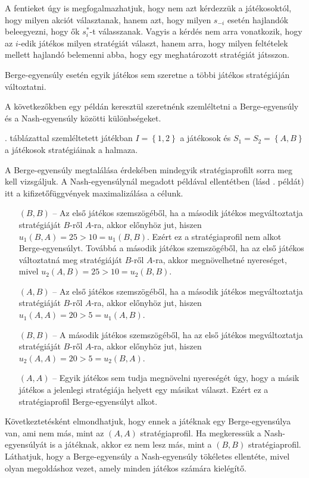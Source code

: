 A fentieket úgy is megfogalmazhatjuk, hogy nem azt kérdezzük a játékosoktól, hogy milyen akciót választanak, hanem azt, hogy milyen $s_{-i}$ esetén hajlandók beleegyezni, hogy ők $s^*_i$-t válasszanak.
Vagyis a kérdés nem arra vonatkozik, hogy az $i$-edik játékos milyen stratégiát választ, hanem arra, hogy milyen feltételek mellett hajlandó belemenni abba, hogy egy meghatározott stratégiát játsszon.

Berge-egyensúly esetén egyik játékos sem szeretne a többi játékos stratégiáján változtatni.


A következőkben egy példán keresztül szeretnénk szemléltetni a Berge-egyensúly és a Nash-egyensúly közötti különbségeket.

\begin{pld}
  . táblázattal szemléltetett játékban $I = \left\{1, 2\right\}$ a játékosok és $S_1 = S_2 = \left\{A, B\right\}$ a játékosok stratégiáinak a halmaza.

  A Berge-egyensúly megtalálása érdekében mindegyik stratégiaprofilt sorra meg kell vizsgáljuk.
  A Nash-egyensúlynál megadott példával ellentétben (lásd . példát) itt a kifizetőfüggvények maximalizálása a célunk.

  \begin{itemize}
    \item[$(B, B)$] -- Az első játékos szemszögéből, ha a második játékos megváltoztatja stratégiáját $B$-ről $A$-ra, akkor előnyhöz jut, hiszen $u_1(B, A) = 25 > 10 = u_1(B, B)$.
          Ezért ez a stratégiaprofil nem alkot Berge-egyensúlyt.
          Továbbá a második játékos szemszögéből, ha az első játékos változtatná meg stratégiáját $B$-ről $A$-ra, akkor megnövelhetné nyereséget, mivel $u_2(A, B) = 25 > 10 = u_2(B, B)$.
    \item[$(A, B)$] -- Az első játékos szemszögéből, ha a második játékos megváltoztatja stratégiáját $B$-ről $A$-ra, akkor előnyhöz jut, hiszen $u_1(A, A) = 20 > 5 = u_1(A, B)$.
    \item[$(B, B)$] -- A második játékos szemszögéből, ha az első játékos megváltoztatja stratégiáját $B$-ről $A$-ra, akkor előnyhöz jut, hiszen $u_2(A, A) = 20 > 5 = u_2(B, A)$.
    \item[$(A, A)$] -- Egyik játékos sem tudja megnövelni nyereségét úgy, hogy a másik játékos a jelenlegi stratégiája helyett egy másikat választ.
          Ezért ez a stratégiaprofil Berge-egyensúlyt alkot.
  \end{itemize}

  Következtetésként elmondhatjuk, hogy ennek a játéknak egy Berge-egyensúlya van, ami nem más, mint az $(A, A)$ stratégiaprofil.
  Ha megkeressük a Nash-egyensúlyát is a játéknak, akkor ez nem lesz más, mint a $(B, B)$ stratégiaprofil.
  Láthatjuk, hogy a Berge-egyensúly a Nash-egyensúly tökéletes ellentéte, mivel olyan megoldáshoz vezet, amely minden játékos számára kielégítő.
\end{pld}

